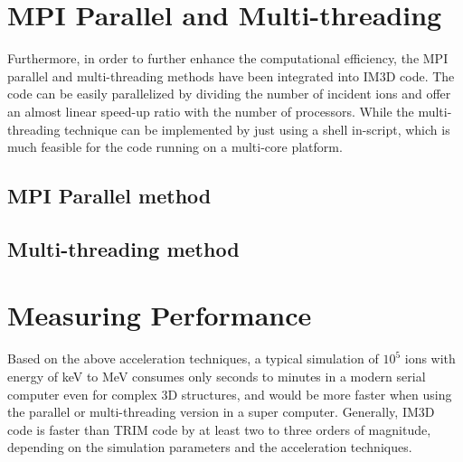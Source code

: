 \subsection{}


\subsection{}


\subsection{}



\section{MPI Parallel and Multi-threading}

Furthermore, in order to further enhance the computational efficiency, the MPI parallel and multi-threading methods have been integrated into IM3D code. The code can be easily parallelized by dividing the number of incident ions and offer an almost linear speed-up ratio with the number of processors. While the multi-threading technique can be implemented by just using a shell in-script, which is much feasible for the code running on a multi-core platform.

\subsection{MPI Parallel method}

\subsection{Multi-threading method}




\section{Measuring Performance}

Based on the above acceleration techniques, a typical simulation of $10^5$ ions with energy of keV to MeV consumes only seconds to minutes in a modern serial computer even for complex 3D structures, and would be more faster when using the parallel or multi-threading version in a super computer. Generally, IM3D code is faster than TRIM code by at least two to three orders of magnitude, depending on the simulation parameters and the acceleration techniques.

\subsection{}


\subsection{}


